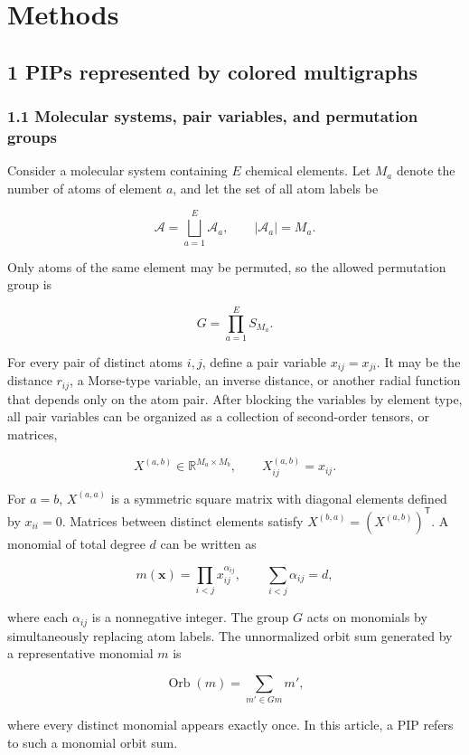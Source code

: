 \section{Methods}\label{sec:methods}

\subsection{1 PIPs represented by colored multigraphs}\label{sec:cmg-pip}

\subsubsection{1.1 Molecular systems, pair variables, and permutation groups}\label{sec:molecular-system}

Consider a molecular system containing \(E\) chemical elements. Let \(M_a\) denote the number of atoms of element \(a\), and let the set of all atom labels be

\[
\mathcal A=\bigsqcup_{a=1}^{E}\mathcal A_a,
\qquad |\mathcal A_a|=M_a .
\]

Only atoms of the same element may be permuted, so the allowed permutation group is

\[
G=\prod_{a=1}^{E}S_{M_a}.
\]

For every pair of distinct atoms \(i,j\), define a pair variable \(x_{ij}=x_{ji}\). It may be the distance \(r_{ij}\), a Morse-type variable, an inverse distance, or another radial function that depends only on the atom pair. After blocking the variables by element type, all pair variables can be organized as a collection of second-order tensors, or matrices,

\[
X^{(a,b)}\in\mathbb R^{M_a\times M_b},
\qquad
X^{(a,b)}_{ij}=x_{ij}.
\]

For \(a=b\), \(X^{(a,a)}\) is a symmetric square matrix with diagonal elements defined by \(x_{ii}=0\). Matrices between distinct elements satisfy \(X^{(b,a)}=(X^{(a,b)})^\mathsf T\). A monomial of total degree \(d\) can be written as

\[
m(\mathbf x)=\prod_{i<j}x_{ij}^{\alpha_{ij}},
\qquad
\sum_{i<j}\alpha_{ij}=d ,
\]

where each \(\alpha_{ij}\) is a nonnegative integer. The group \(G\) acts on monomials by simultaneously replacing atom labels. The unnormalized orbit sum generated by a representative monomial \(m\) is

\[
\operatorname{Orb}(m)=\sum_{m'\in Gm}m' ,
\]

where every distinct monomial appears exactly once. In this article, a PIP refers to such a monomial orbit sum.

